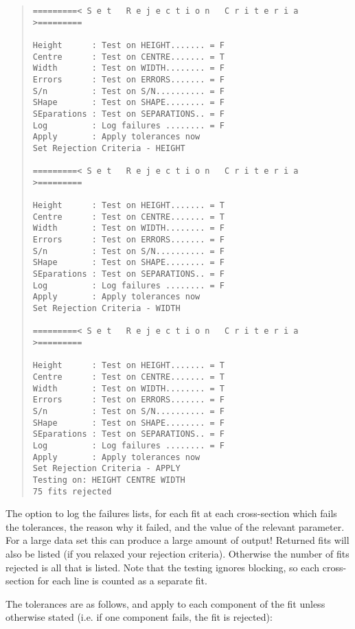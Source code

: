 \begin{quote}
\begin{verbatim}
=========< S e t   R e j e c t i o n   C r i t e r i a >=========
 
Height      : Test on HEIGHT....... = F
Centre      : Test on CENTRE....... = T
Width       : Test on WIDTH........ = F
Errors      : Test on ERRORS....... = F
S/n         : Test on S/N.......... = F
SHape       : Test on SHAPE........ = F
SEparations : Test on SEPARATIONS.. = F
Log         : Log failures ........ = F
Apply       : Apply tolerances now
Set Rejection Criteria - HEIGHT
 
=========< S e t   R e j e c t i o n   C r i t e r i a >=========
 
Height      : Test on HEIGHT....... = T
Centre      : Test on CENTRE....... = T
Width       : Test on WIDTH........ = F
Errors      : Test on ERRORS....... = F
S/n         : Test on S/N.......... = F
SHape       : Test on SHAPE........ = F
SEparations : Test on SEPARATIONS.. = F
Log         : Log failures ........ = F
Apply       : Apply tolerances now
Set Rejection Criteria - WIDTH
 
=========< S e t   R e j e c t i o n   C r i t e r i a >=========
 
Height      : Test on HEIGHT....... = T
Centre      : Test on CENTRE....... = T
Width       : Test on WIDTH........ = T
Errors      : Test on ERRORS....... = F
S/n         : Test on S/N.......... = F
SHape       : Test on SHAPE........ = F
SEparations : Test on SEPARATIONS.. = F
Log         : Log failures ........ = F
Apply       : Apply tolerances now
Set Rejection Criteria - APPLY
Testing on: HEIGHT CENTRE WIDTH
75 fits rejected
\end{verbatim}\end{quote}

The option to log the failures lists, for each fit at each
cross-section which fails the tolerances, the reason why it failed, and
the value of the relevant parameter.
For a large data set this can produce a large amount of output!
Returned fits will also be listed (if you relaxed your rejection
criteria).
Otherwise the number of fits rejected is all that is listed.
Note that the testing ignores blocking, so each cross-section for each
line is counted as a separate fit.

The tolerances are as follows, and apply to each component of the fit
unless otherwise stated (i.e. if one component fails, the fit is
rejected):

